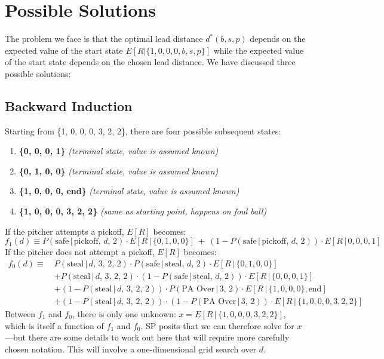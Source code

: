 \documentclass{article}
\begin{document}
  \section{Possible Solutions}

    The problem we face is that the optimal lead distance $d^*(b, s, p)$ depends on the expected value of the start state $E[R | \{1, 0, 0, 0, b, s, p\}]$ while the expected value of the start state depends on the chosen lead distance. We have discussed three possible solutions:

    \subsection{Backward Induction}
    Starting from \{1, 0, 0, 0, 3, 2, 2\}, there are four possible subsequent states:
    \begin{enumerate}
        \item {\bf \{0, 0, 0, 1\}} {\it (terminal state, value is assumed known)}
        \item {\bf \{0, 1, 0, 0\}} {\it (terminal state, value is assumed known)}
        \item {\bf \{1, 0, 0, 0, end\}} {\it (terminal state, value is assumed known)}
        \item {\bf \{1, 0, 0, 0, 3, 2, 2\}} {\it (same as starting point, happens on foul ball)}
    \end{enumerate}
    If the pitcher attempts a pickoff, $E[R]$ becomes:
    $$
      f_1(d) \equiv P(\mbox{safe}\, |\, \mbox{pickoff},\, d,\, 2) \cdot E[R\, |\, \{0, 1, 0, 0\}]~+~(1 - P(\mbox{safe}\, |\, \mbox{pickoff},\, d,\, 2)) \cdot E[R\, |\, {0, 0, 0, 1}]
    $$
    If the pitcher does not attempt a pickoff, $E[R]$ becomes:
    \begin{align*}
      f_0(d) \equiv~& P(\mbox{steal}\, |\, d,\, 3,\, 2,\, 2) \cdot P(\mbox{safe}\, |\, \mbox{steal},\, d,\, 2) \cdot E[R\, |\, \{0, 1, 0, 0\}]\\
      & + P(\mbox{steal}\, |\, d,\, 3,\, 2,\, 2) \cdot (1 - P(\mbox{safe}\, |\, \mbox{steal},\, d,\, 2)) \cdot E[R\, |\, \{0, 0, 0, 1\}]\\
      & + (1 - P(\mbox{steal}\, |\, d,\, 3,\, 2,\, 2)) \cdot P(\mbox{PA Over}\, |\, 3,\, 2) \cdot E[R\, |\, \{1, 0, 0, 0\}, \mbox{end}]\\
      & + (1 - P(\mbox{steal}\, |\, d,\, 3,\, 2,\, 2)) \cdot (1 - P(\mbox{PA Over}\, |\, 3,\, 2)) \cdot E[R\, |\, \{1, 0, 0, 0, 3, 2, 2\}]
    \end{align*}
    Between $f_1$ and $f_0$, there is only one unknown: $x = E[R\, |\, \{1, 0, 0, 0, 3, 2, 2\}]$, which is itself a function of $f_1$ and $f_0$. SP posits that we can therefore solve for $x$---but there are some details to work out here that will require more carefully chosen notation. This will involve a one-dimensional grid search over $d$.
\end{document}

